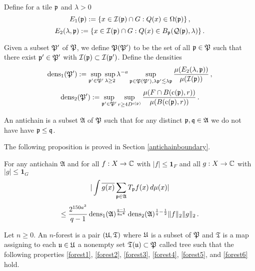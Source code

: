 Define for a tile ${\mathfrak p}$ and $\lambda>0$
\begin{equation}\label{definee1}
    E_1({\mathfrak p}):=\{x\in {\mathcal{I}}({\mathfrak p})\cap G: {Q}(x)\in {\Omega}({\mathfrak p})\}\, ,
\end{equation}
\begin{equation}\label{definee2}
    E_2(\lambda, {\mathfrak p}):=\{x\in {\mathcal{I}}({\mathfrak p})\cap G: {Q}(x)\in B_{{\mathfrak p}}({\mathcal{Q}}({\mathfrak p}), \lambda)\}\, .
\end{equation}



Given a subset ${\mathfrak P}'$ of ${\mathfrak P}$, we define
${\mathfrak P}({\mathfrak P}')$ to be the set of
all ${\mathfrak p} \in {\mathfrak P}$ such that there exist ${\mathfrak p}' \in {\mathfrak P}'$ with ${\mathcal{I}}({\mathfrak p})\subset {\mathcal{I}}({\mathfrak p}')$. Define  the densities
\begin{equation}\label{definedens1}
    {\operatorname{\operatorname{dens}}}_1({\mathfrak P}') := \sup_{{\mathfrak p}'\in {\mathfrak P}'}\sup_{\lambda \geq 2} \lambda^{-a} \sup_{{\mathfrak p} \in {\mathfrak P}({\mathfrak P}'), \lambda {\mathfrak p}' \lesssim \lambda {\mathfrak p}}
    \frac{\mu({E}_2(\lambda, {\mathfrak p}))}{\mu({\mathcal{I}}({\mathfrak p}))}\, ,
\end{equation}
\begin{equation}\label{definedens2}
    {\operatorname{\operatorname{dens}}}_2({\mathfrak P}') := \sup_{{\mathfrak p}'\in {\mathfrak P}'}
    \sup_{r\ge 4D^{{\mathrm{s}}({\mathfrak p})}}
    \frac{\mu(F\cap B({\mathrm{c}}({\mathfrak p}),r))}{\mu(B({\mathrm{c}}({\mathfrak p}),r))}\, .
\end{equation}





An antichain is a subset $\mathfrak{A}$
of ${\mathfrak P}$ such that for any distinct ${\mathfrak p},{\mathfrak q}\in \mathfrak{A}$ we do not have have ${\mathfrak p}\le {\mathfrak q}$.

The following proposition is proved in Section \ref{antichainboundary}.

\begin{proposition}
\label{antichain-operator}

For any antichain $\mathfrak{A} $ and  for all $f:X\to {\mathbb{C}}$ with $|f|\le \mathbf{1}_F$ and all $g:X\to{\mathbb{C}}$ with $|g| \le \mathbf{1}_G$
\begin{equation} \label{eq-antiprop}
    |\int  \overline{g(x)} \sum_{{\mathfrak p} \in \mathfrak{A}} T_{{\mathfrak p}} f(x)\, d\mu(x)|
\end{equation}
\begin{equation}
    \le  \frac{2^{150a^3}}{q-1} \operatorname{\operatorname{dens}}_1(\mathfrak{A})^{\frac {q-1}{8a^4}}\operatorname{\operatorname{dens}}_2(\mathfrak{A})^{\frac 1{q}-\frac 12}  \|f\|_2 \|g\|_2\, .
\end{equation}
\end{proposition}

Let $n\ge 0$.
An $n$-forest is a pair $({\mathfrak U}, \mathfrak{T})$
where  ${\mathfrak U}$ is a subset of ${\mathfrak P}$
and $\mathfrak{T}$ is a map assigning to
each ${\mathfrak u}\in {\mathfrak U}$ a nonempty set ${\mathfrak T} ({\mathfrak u})\subset {\mathfrak P}$ called tree
such that the following properties
\eqref{forest1}, \eqref{forest2},
\eqref{forest3},
\eqref{forest4},
\eqref{forest5}, and
\eqref{forest6}
hold.


